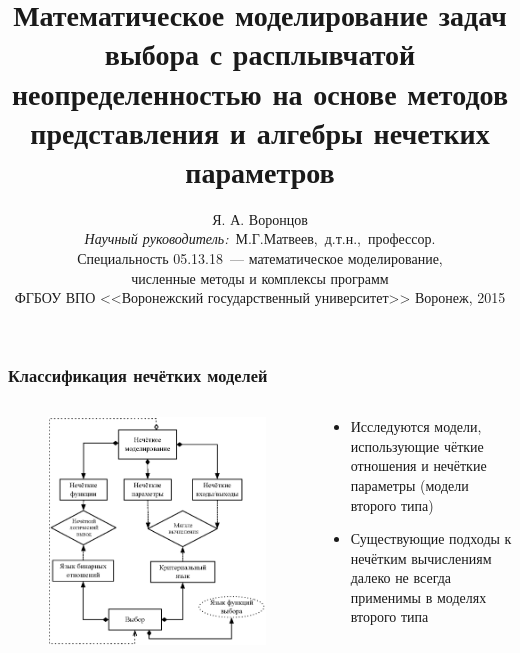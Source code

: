 \documentclass[12pt]{beamer}
\title{\Large{Математическое моделирование задач выбора с расплывчатой неопределенностью на основе методов представления и алгебры нечетких параметров}}
\author{\normalsize{%
Я. А. Воронцов\\%
\emph{Научный руководитель:}~М.Г.Матвеев,~д.т.н.,~профессор.}\\%
\small{
\vspace{2pt}
Специальность 05.13.18~--- математическое моделирование,\\ численные методы и комплексы программ \\
\vspace{2pt}
ФГБОУ ВПО <<Воронежский государственный университет>>%
\vspace{10pt}%
}
\small{Воронеж, 2015}
}
\begin{document}
\maketitle


\begin{frame}
  \frametitle{Классификация нечётких моделей}
  \begin{columns}[onlytextwidth]
    \begin{column}{0.6\textwidth}
      \begin{figure}[h]
        \includegraphics[width=\textwidth]{choice-classification}
      \end{figure}
    \end{column}
    \begin{column}{0.4\textwidth}
      \begin{itemize}
        \item Исследуются модели, использующие чёткие отношения и нечёткие параметры (модели второго типа)
        \item Существующие подходы к нечётким вычислениям далеко не всегда применимы в моделях второго типа
      \end{itemize}
    \end{column}
  \end{columns}
\end{frame}
\end{document}
